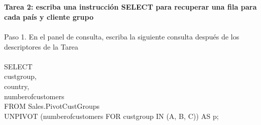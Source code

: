 \begin{flushleft}
\begin{center}
\end{center}
\textbf{}\\
\textbf{}\\
\textbf{}\\
\textbf{}\\
\textbf{}\\
\textbf{}\\
\textbf{}\\
\textbf{}\\
\textbf{}\\
\textbf{}\\
\textbf{}\\
\textbf{}\\
\textbf{}\\
\textbf{}\\

\textbf {Tarea 2: escriba una instrucción SELECT para recuperar una fila para cada país y cliente grupo}
\textbf{}\\
\textbf{}\\
Paso 1. En el panel de consulta, escriba la siguiente consulta después de los descriptores de la Tarea 
\textbf{}\\
\textbf{}\\
SELECT\\
custgroup,\\
country,\\
numberofcustomers\\
FROM Sales.PivotCustGroups\\
UNPIVOT (numberofcustomers FOR custgroup IN (A, B, C)) AS p;
\textbf{}\\
\textbf{}\\


\end{flushleft}

